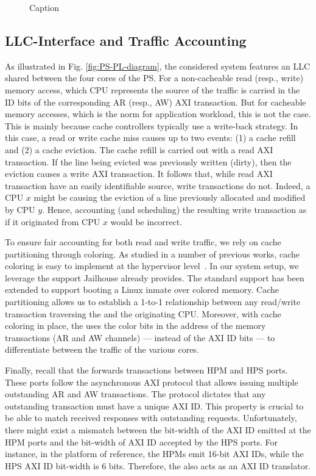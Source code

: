 \begin{figure}
  \centering
  
  \caption{Caption}
  \label{fig:SchIM_transaction_scheme_figure}
\end{figure}

\subsection{LLC-\schim Interface and Traffic Accounting}
As illustrated in Fig. \ref{fig:PS-PL-diagram}, the considered system
features an LLC shared between the four cores of the PS. For a
non-cacheable read (resp., write) memory access, which CPU represents
the source of the traffic is carried in the ID bits of the
corresponding AR (resp., AW) AXI transaction. But for cacheable memory
accesses, which is the norm for application workload, this is not the
case. This is mainly because cache controllers typically use a
write-back strategy. In this case, a read or write cache miss causes
up to two events: (1) a cache refill and (2) a cache eviction. The
cache refill is carried out with a read AXI transaction. If the line
being evicted was previously written (dirty), then the eviction causes
a write AXI transaction. It follows that, while read AXI transaction
have an easily identifiable source, write transactions do not. Indeed,
a CPU $x$ might be causing the eviction of a line previously allocated
and modified by CPU $y$. Hence, accounting (and scheduling) the
resulting write transaction as if it originated from CPU $x$ would be
incorrect.

To ensure fair accounting for both read and write traffic, we rely on
cache partitioning through coloring. As studied in a number of
previous works, cache coloring is easy to implement at the hypervisor
level~\cite{biondi_xvisor, cmu_virtpart, detvrt_rtas19}. In our system
setup, we leverage the support Jailhouse already provides. The
standard support has been extended to support booting a Linux inmate
over colored memory. Cache partitioning allows us to establish a
1-to-1 relationship between any read/write transaction traversing the
\schim and the originating CPU. Moreover, with cache coloring in
place, the \schim uses the color bits in the address of the memory
transactions (AR and AW channels) --- instead of the AXI ID bits ---
to differentiate between the traffic of the various cores.

Finally, recall that the \schim forwards transactions between HPM and
HPS ports. These ports follow the asynchronous AXI protocol that
allows issuing multiple outstanding AR and AW transactions. The
protocol dictates that any outstanding transaction must have a unique
AXI ID. This property is crucial to be able to match received
responses with outstanding requests. Unfortunately, there might exist
a mismatch between the bit-width of the AXI ID emitted at the HPM
ports and the bit-width of AXI ID accepted by the HPS ports. For
instance, in the platform of reference, the HPMs emit 16-bit AXI IDs,
while the HPS AXI ID bit-width is 6 bits. Therefore, the \schim also
acts as an AXI ID translator.

